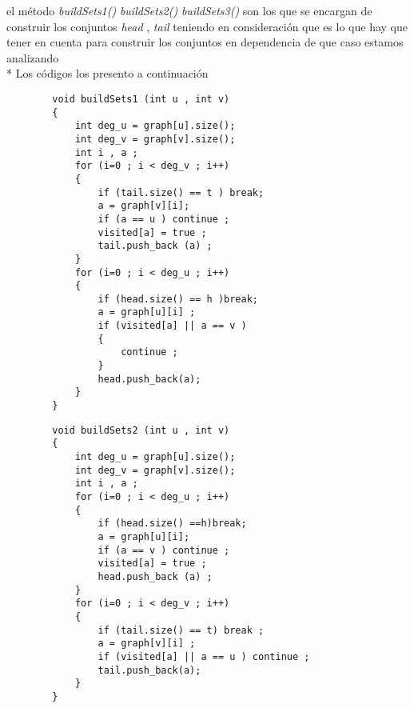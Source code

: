 \documentclass[12pt]{article}
\begin{document}
    \noindent el m\'etodo \textit{ buildSets1()}  \textit{ buildSets2()} \textit{ buildSets3()} son los  que se encargan de construir los conjuntos \textit{head} , \textit{tail} teniendo en consideraci\'on que es lo que hay que tener en cuenta para construir los conjuntos en dependencia de que caso estamos analizando 
    \\*
    Los c\'odigos los presento a continuaci\'on 
    
    \begin{verbatim}
        void buildSets1 (int u , int v)
        {
            int deg_u = graph[u].size(); 
            int deg_v = graph[v].size(); 
            int i , a ; 
            for (i=0 ; i < deg_v ; i++)
            {
                if (tail.size() == t ) break;  
                a = graph[v][i]; 
                if (a == u ) continue ;     
                visited[a] = true ;  
                tail.push_back (a) ;   
            }
            for (i=0 ; i < deg_u ; i++)
            {
                if (head.size() == h )break; 
                a = graph[u][i] ; 
                if (visited[a] || a == v ) 
                {
                    continue ; 
                }
                head.push_back(a);  
            }
        }
    \end{verbatim}

    \begin{verbatim}
        void buildSets2 (int u , int v)
        {
            int deg_u = graph[u].size(); 
            int deg_v = graph[v].size(); 
            int i , a ; 
            for (i=0 ; i < deg_u ; i++)
            {
                if (head.size() ==h)break; 
                a = graph[u][i]; 
                if (a == v ) continue ; 
                visited[a] = true ; 
                head.push_back (a) ; 
            }
            for (i=0 ; i < deg_v ; i++)
            {
                if (tail.size() == t) break ;
                a = graph[v][i] ; 
                if (visited[a] || a == u ) continue ; 
                tail.push_back(a); 
            }
        }
    \end{verbatim}
\end{document}
